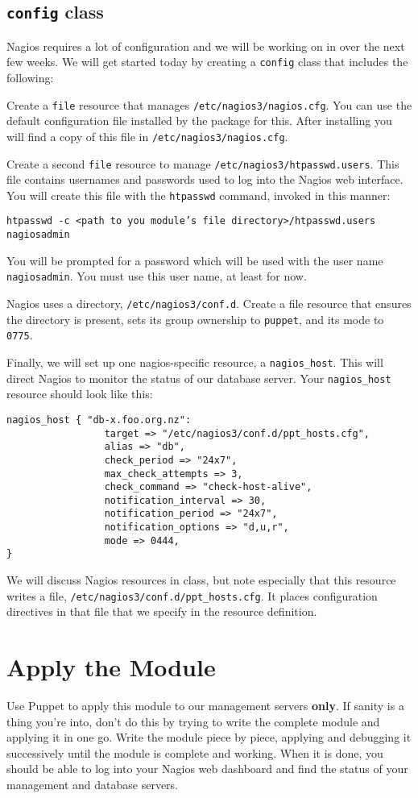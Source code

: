 \documentclass{article}   	%
\begin{document}
\subsection{\texttt{config} class}
Nagios requires a lot of configuration and we will be working on in over the next few weeks. We will get started today by creating a \texttt{config} class that includes the following: 

Create a \texttt{file} resource that manages \texttt{/etc/nagios3/nagios.cfg}. You can use the default configuration file installed by the package for this. After installing you will find a copy of this file in \texttt{/etc/nagios3/nagios.cfg}. 

Create a second \texttt{file} resource to manage \texttt{/etc/nagios3/htpasswd.users}. This file contains usernames and passwords used to log into the Nagios web interface. You will create this file with the \texttt{htpasswd} command, invoked in this manner:

\texttt{htpasswd -c <path to you module's file directory>/htpasswd.users nagiosadmin}

You will be prompted for a password which will be used with the user name \texttt{nagiosadmin}. You must use this user name, at least for now.

Nagios uses a directory, \texttt{/etc/nagios3/conf.d}. Create a file resource that ensures the directory is present, sets its group ownership to \texttt{puppet}, and its mode to \texttt{0775}.

Finally, we will set up one nagios-specific resource, a \texttt{nagios\_host}. This will direct Nagios to monitor the status of our database server. Your \texttt{nagios\_host} resource should look like this:

\begin{verbatim}
nagios_host { "db-x.foo.org.nz":
                 target => "/etc/nagios3/conf.d/ppt_hosts.cfg",
                 alias => "db",
                 check_period => "24x7",
                 max_check_attempts => 3,
                 check_command => "check-host-alive",
                 notification_interval => 30,
                 notification_period => "24x7",
                 notification_options => "d,u,r",
                 mode => 0444,
}

\end{verbatim}

We will discuss Nagios resources in class, but note especially that this resource writes a file, \texttt{/etc/nagios3/conf.d/ppt\_hosts.cfg}. It places configuration directives in that file that we specify in the resource definition.

\section{Apply the Module}

Use Puppet to apply this module to our management servers \textbf{only}. If sanity is a thing you're into, don't do this by trying to write the complete module and applying it in one go. Write the module piece by piece, applying and debugging it successively until the module is complete and working. When it is done, you should be able to log into your Nagios web dashboard and find the status of your management and database servers. 
\end{document}
